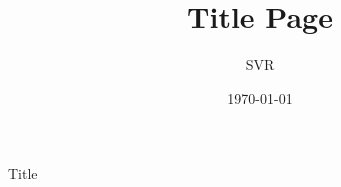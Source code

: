 \documentclass[aspectratio  = 169,
               12pt]{beamer}
\title{     Title Page}
\date{\today}
\author{    SVR}
\institute{ Boston University \\ College of Engineering}
\begin{document}
\maketitle




\begin{frame}{Title}
    \lipsum
\end{frame}

















\end{document}
